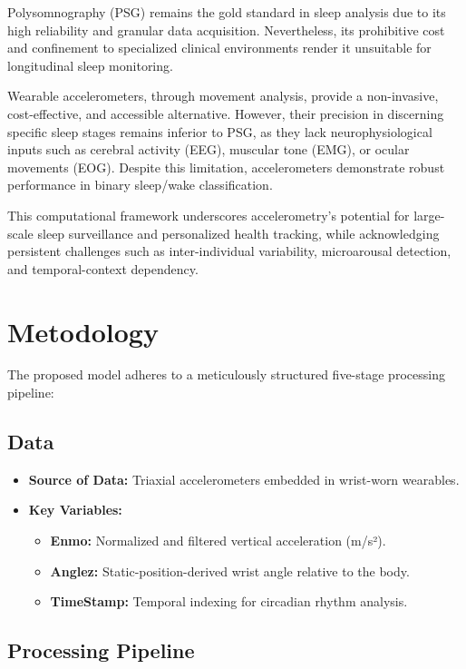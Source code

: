 \documentclass[conference]{IEEEtran}
\begin{document}
Polysomnography (PSG) remains the gold standard in sleep analysis due to its high reliability and granular data acquisition. Nevertheless, its prohibitive cost and confinement to specialized clinical environments render it unsuitable for longitudinal sleep monitoring.

Wearable accelerometers, through movement analysis, provide a non-invasive, cost-effective, and accessible alternative. However, their precision in discerning specific sleep stages remains inferior to PSG, as they lack neurophysiological inputs such as cerebral activity (EEG), muscular tone (EMG), or ocular movements (EOG). Despite this limitation, accelerometers demonstrate robust performance in binary sleep/wake classification.

This computational framework underscores accelerometry's potential for large-scale sleep surveillance and personalized health tracking, while acknowledging persistent challenges such as inter-individual variability, microarousal detection, and temporal-context dependency.


\section{Metodology}

The proposed model adheres to a meticulously structured five-stage processing pipeline:
\subsection{Data}
\begin{itemize}
	\item \textbf{Source of Data:}
	      Triaxial accelerometers embedded in wrist-worn wearables.
	\item \textbf{Key Variables:}
	      \begin{itemize}
		      \item \textbf{Enmo:}  Normalized and filtered vertical acceleration (m/s²).
		      \item \textbf{Anglez:} Static-position-derived wrist angle relative to the body.
                \item \textbf{TimeStamp:} Temporal indexing for circadian rhythm analysis.
	      \end{itemize}
\end{itemize}
\subsection{Processing Pipeline}
\end{document}
